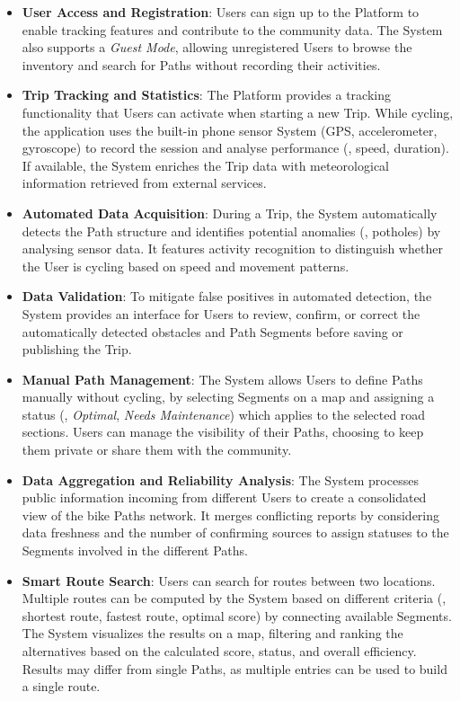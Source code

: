 \begin{itemize}
    \item \textbf{User Access and Registration}: Users can sign up to the Platform to enable tracking features and contribute to the community data. The System also supports a \emph{Guest Mode}, allowing unregistered Users to browse the inventory and search for Paths without recording their activities.
    
    \item \textbf{Trip Tracking and Statistics}: The Platform provides a tracking functionality that Users can activate when starting a new Trip. While cycling, the application uses the built-in phone sensor System (GPS, accelerometer, gyroscope) to record the session and analyse performance (\eg, speed, duration). If available, the System enriches the Trip data with meteorological information retrieved from external services.
    
    \item \textbf{Automated Data Acquisition}: During a Trip, the System automatically detects the Path structure and identifies potential anomalies (\eg, potholes) by analysing sensor data. It features activity recognition to distinguish whether the User is cycling based on speed and movement patterns.
    
    \item \textbf{Data Validation}: To mitigate false positives in automated detection, the System provides an interface for Users to review, confirm, or correct the automatically detected obstacles and Path Segments before saving or publishing the Trip.
    
    \item \textbf{Manual Path Management}: The System allows Users to define Paths manually without cycling, by selecting Segments on a map and assigning a status (\eg, \emph{Optimal}, \emph{Needs Maintenance}) which applies to the selected road sections. Users can manage the visibility of their Paths, choosing to keep them private or share them with the community.
    
    \item \textbf{Data Aggregation and Reliability Analysis}: The System processes public information incoming from different Users to create a consolidated view of the bike Paths network. It merges conflicting reports by considering data freshness and the number of confirming sources to assign statuses to the Segments involved in the different Paths.
    
    \item \textbf{Smart Route Search}: Users can search for routes between two locations. Multiple routes can be computed by the System based on different criteria (\eg, shortest route, fastest route, optimal score) by connecting available Segments. The System visualizes the results on a map, filtering and ranking the alternatives based on the calculated score, status, and overall efficiency. Results may differ from single Paths, as multiple entries can be used to build a single route. 
\end{itemize}

